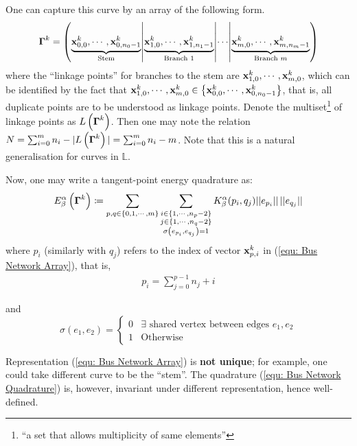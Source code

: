 \documentclass[../dissertation.tex]{subfiles}
\begin{document}
One can capture this curve by an array of the following form.
\begin{equation}
    \boldsymbol{\Gamma}^k = \left( \underbrace{\mathbf{x}_{0,0}^k, \cdots, \mathbf{x}_{0,n_0-1}^k}_{\text{Stem}} \middle|
    \underbrace{\mathbf{x}_{1,0}^k, \cdots, \mathbf{x}_{1,n_1-1}^k}_{\text{Branch 1}}
\middle| \cdots \middle|
\underbrace{\mathbf{x}_{m,0}^k, \cdots, \mathbf{x}_{m,n_m-1}^k}_{\text{Branch } m}\right)
\label{equ: Bus Network Array}
\end{equation}
where the ``linkage points'' for branches to the stem are $\mathbf{x}_{1,0}^k, \cdots, \mathbf{x}_{m,0}^k$,
which can be identified by the fact that $\mathbf{x}_{1,0}^k, \cdots, \mathbf{x}_{m,0}^k \in \left\{ \mathbf{x}_{0,0}^k, \cdots, \mathbf{x}_{0, n_0-1}^k \right\}$,
that is, all duplicate points are to be understood as linkage points.
Denote the multiset\footnote{``a set that allows multiplicity of same elements''} of linkage points as $L \left( \boldsymbol{\Gamma}^k \right)$.
Then one may note the relation $N = \sum_{i=0}^{m} n_{i} - |L\left( \boldsymbol{\Gamma}^k \right)| = \sum_{i=0}^m n_i - m$.
Note that this is a natural generalisation for curves in $\mathbb{L}$.

Now, one may write a tangent-point energy quadrature as:
\begin{equation}
    E_{\beta}^{\alpha} \left( \boldsymbol{\Gamma}^k \right) \coloneqq 
    \sum_{p, q \in \left\{ 0, 1, \cdots, m \right\}}
    \sum_{\substack{
            i \in \left\{ 1, \cdots, n_p - 2 \right\} \\
            j \in \left\{ 1, \cdots, n_q - 2 \right\} \\
            \sigma \left( e_{p_i}, e_{q_j} \right) = 1
    }}
    K_{\beta}^{\alpha} (p_i,q_j) \lvert \lvert e_{p_i} \rvert \rvert \, \lvert \lvert e_{q_j} \rvert \rvert
    \label{equ: Bus Network Quadrature}
\end{equation}
where $p_i$ (similarly with $q_j$) refers to the index of vector $\mathbf{x}_{p,i}^k$ in (\ref{equ: Bus Network Array}),
that is,
\begin{align*}
    p_i = \sum_{j=0}^{p-1} n_j + i
\end{align*}

and
\begin{equation*}
    \sigma \left( e_1, e_2 \right) =
    \begin{cases}
        0 & \exists \text{ shared vertex between edges } e_1, e_2 \\
        1 & \text{Otherwise}
    \end{cases}
\end{equation*}

\begin{remark}
    Representation (\ref{equ: Bus Network Array}) is \textbf{not unique}; for example, one could take different curve to be the ``stem''.
    The quadrature (\ref{equ: Bus Network Quadrature}) is, however, invariant under different representation, hence well-defined.
\end{remark}
\end{document}
